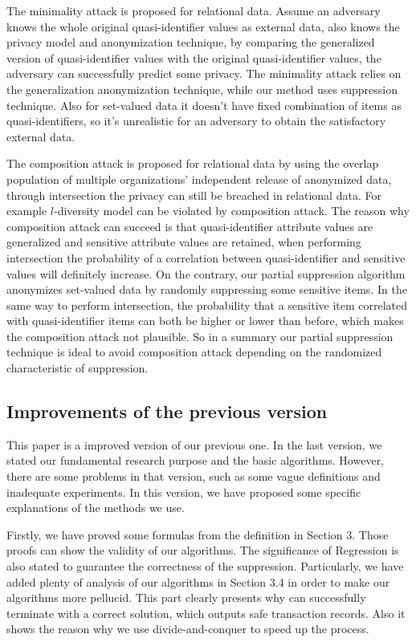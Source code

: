 The minimality attack \cite{Wong:2007:Minimality}
is proposed for relational data. Assume an adversary knows the whole original
quasi-identifier values as external data, also knows the privacy model and
anonymization technique, by comparing the generalized version of
quasi-identifier values with the original quasi-identifier values, the
adversary can successfully predict some privacy. The minimality attack relies
on the generalization anonymization technique, while our method uses
suppression technique. Also for set-valued data it doesn't have fixed
combination of items as quasi-identifiers, so it's unrealistic for an
adversary to obtain the satisfactory external data.

The composition attack
\cite{Ganta:2008:Composition} is proposed for relational data by using the
overlap population of multiple organizations' independent release of
anonymized data, through intersection the privacy can still be breached in
relational data. For example $l$-diversity \cite{Ganta:2008:Composition}
model can be violated by composition attack. The reason why composition
attack can succeed is that quasi-identifier attribute values are generalized
and sensitive attribute values are retained, when performing intersection the
probability of a correlation between quasi-identifier and sensitive values
will definitely increase. On the contrary, our partial suppression algorithm
anonymizes set-valued data by randomly suppressing some sensitive items. In
the same way to perform intersection,
 the probability that a sensitive item correlated with quasi-identifier items can
both be higher or lower than before, which makes the
composition attack not plausible. So in a summary our partial suppression technique is ideal to
avoid composition attack depending on the randomized characteristic of
suppression.

\subsection{Improvements of the previous version}
This paper is a improved version of our previous one\cite{DASFAA:2014}.
In the last version, we stated our fundamental research purpose and the basic algorithms. However, there are some problems in that version, such as some vague definitions and inadequate experiments. In this version, we have proposed some specific explanations of the methods we use.

Firstly, we have proved some formulas from the definition in Section 3. Those proofs can show the validity of our algorithms. The significance of Regression is also stated to guarantee the correctness of the suppression. Particularly, we have added plenty of analysis of our algorithms in Section 3.4 in order to make our algorithms more pellucid. This part clearly presents why \PartialSuppressor can successfully terminate with a correct solution, which outputs safe transaction records. Also it shows the reason why we use divide-and-conquer to speed up the process.

